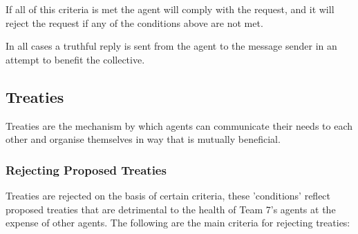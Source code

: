 If all of this criteria is met the agent will comply with the request, and it will reject the request if any of the conditions above are not met.

In all cases a truthful reply is sent from the agent to the message sender in an attempt to benefit the collective.

\subsection{Treaties}
Treaties are the mechanism by which agents can communicate their needs to each other and organise themselves in way that is mutually beneficial.  

\subsubsection{Rejecting Proposed Treaties}
\label{subsec: Rejecting Treaties}
Treaties are rejected on the basis of certain criteria, these 'conditions' reflect proposed treaties that are detrimental to the health of Team 7's agents at the expense of other agents. The following are the main criteria for rejecting treaties:

